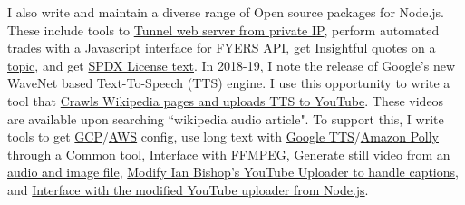 \vspace{-3ex}
I also write and maintain a diverse range of Open source packages for Node.js. These include tools to \href{https://github.com/nodef/extra-tunnel}{Tunnel web server from private IP}, perform automated trades with a \href{https://github.com/nodef/extra-fyers}{Javascript interface for FYERS API}, get \href{https://github.com/nodef/extra-quotes}{Insightful quotes on a topic}, and get \href{https://github.com/nodef/extra-license}{SPDX License text}. In 2018-19, I note the release of Google's new WaveNet based Text-To-Speech (TTS) engine. I use this opportunity to write a tool that \href{https://github.com/nodef/wikipedia-tts}{Crawls Wikipedia pages and uploads TTS to YouTube}. These videos are available upon searching ``wikipedia audio article". To support this, I write tools to get \href{https://github.com/nodef/extra-gcpconfig}{GCP}/\href{https://github.com/nodef/extra-awsconfig}{AWS} config, use long text with \href{https://github.com/nodef/extra-googletts}{Google TTS}/\href{https://github.com/nodef/extra-amazontts}{Amazon Polly} through a \href{https://github.com/nodef/extra-tts}{Common tool}, \href{https://github.com/nodef/extra-ffmpeg}{Interface with FFMPEG}, \href{https://github.com/nodef/extra-stillvideo}{Generate still video from an audio and image file}, \href{https://github.com/golangf/porjo--youtubeuploader}{Modify Ian Bishop's YouTube Uploader to handle captions}, and \href{https://github.com/nodef/extra-youtubeuploader}{Interface with the modified YouTube uploader from Node.js}.

